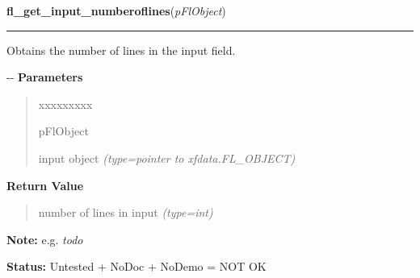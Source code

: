 \hspace{.8\funcindent}\begin{boxedminipage}{\funcwidth}

    \raggedright \textbf{fl\_get\_input\_numberoflines}(\textit{pFlObject})

    \vspace{-1.5ex}

    \rule{\textwidth}{0.5\fboxrule}
\setlength{\parskip}{2ex}

Obtains the number of lines in the input field.

-{}-
\setlength{\parskip}{1ex}
      \textbf{Parameters}
      \vspace{-1ex}

      \begin{quote}
        \begin{Ventry}{xxxxxxxxx}

          \item[pFlObject]


input object
            {\it (type=pointer to xfdata.FL\_OBJECT)}

        \end{Ventry}

      \end{quote}

      \textbf{Return Value}
    \vspace{-1ex}

      \begin{quote}

number of lines in input
      {\it (type=int)}

      \end{quote}

\textbf{Note:} 
e.g. \emph{todo}


\textbf{Status:} 
Untested + NoDoc + NoDemo = NOT OK


    \end{boxedminipage}

    \label{xformslib:flinput:fl_get_input_format}

    \vspace{0.5ex}

